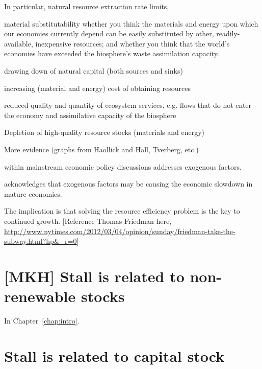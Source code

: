 In particular,
	natural resource extraction rate limits,
	
	material substitutability
whether you think the materials and energy upon which our economies currently depend
	can be easily substituted by other, readily-available, inexpensive resources; and
whether you think that the world's economies have exceeded 
	the biosphere's waste assimilation capacity.




drawing down of natural capital (both sources and sinks)

increasing (material and energy) cost of obtaining resources

reduced quality and quantity of ecosystem services, e.g. flows that do not enter the economy and assimilative capacity of the biosphere

Depletion of high-quality resource stocks (materials and energy)

More evidence (graphs from Haollick and Hall, Tverberg, etc.)




 within mainstream economic policy discussions
addresses exogenous factors.



acknowledges that exogenous factors may be causing the economic slowdown
in mature economies.







The implication is that solving the resource efficiency problem
is the key to continued growth. [Reference Thomas Friedman here,
\url{http://www.nytimes.com/2012/03/04/opinion/sunday/friedman-take-the-subway.html?hp&_r=0}]



\section{[MKH] Stall is related to non-renewable stocks}
\label{sec:stall_non-renewable_stocks}

In Chapter~\ref{chap:intro}.


\section{Stall is related to capital stock}
\label{sec:stall_capital_stock}

